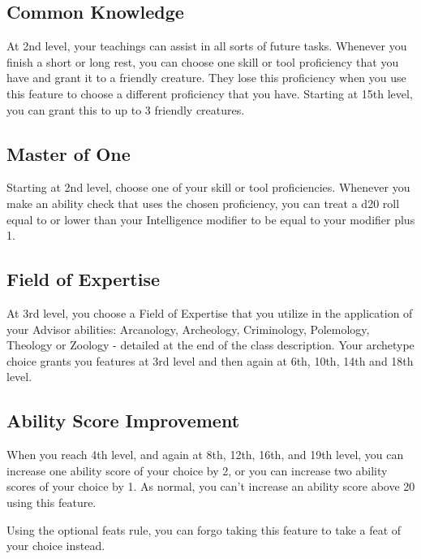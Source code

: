\documentclass[letterpaper,openany,twoside,twocolumn]{book}
\begin{document}
	
	\subsection*{Common Knowledge}
	At 2nd level, your teachings can assist in all sorts of future tasks. Whenever you finish a short or long rest, you can choose one skill or tool proficiency that you have and grant it to a friendly creature. They lose this proficiency when you use this feature to choose a different proficiency that you have. Starting at 15th level, you can grant this to up to 3 friendly creatures.
	
	\subsection*{Master of One}
	Starting at 2nd level, choose one of your skill or tool proficiencies. Whenever you make an ability check that uses the chosen proficiency, you can treat a d20 roll equal to or lower than your Intelligence modifier to be equal to your modifier plus 1.
	
	\subsection*{Field of Expertise}
	At 3rd level, you choose a Field of Expertise that you utilize in the application of your Advisor abilities: Arcanology, Archeology, Criminology, Polemology, Theology or Zoology - detailed at the end of the class description. Your archetype choice grants you features at 3rd level and then again at 6th, 10th, 14th and 18th level.
	
	\subsection*{Ability Score Improvement}
	When you reach 4th level, and again at 8th, 12th, 16th, and 19th level, you can increase one ability score of your choice by 2, or you can increase two ability scores of your choice by 1. As normal, you can't increase an ability score above 20 using this feature.
	
	Using the optional feats rule, you can forgo taking this feature to take a feat of your choice instead.
	
\end{document}

